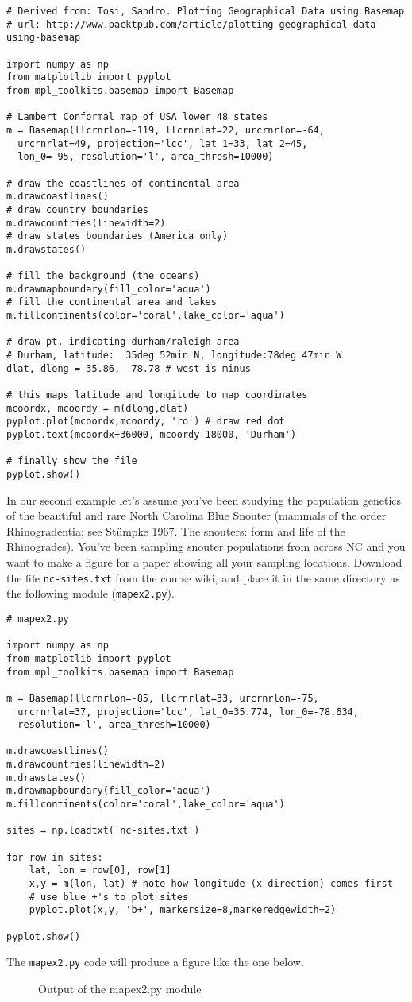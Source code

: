 \begin{lstlisting}
# Derived from: Tosi, Sandro. Plotting Geographical Data using Basemap
# url: http://www.packtpub.com/article/plotting-geographical-data-using-basemap

import numpy as np
from matplotlib import pyplot
from mpl_toolkits.basemap import Basemap

# Lambert Conformal map of USA lower 48 states
m = Basemap(llcrnrlon=-119, llcrnrlat=22, urcrnrlon=-64,
  urcrnrlat=49, projection='lcc', lat_1=33, lat_2=45,
  lon_0=-95, resolution='l', area_thresh=10000)

# draw the coastlines of continental area
m.drawcoastlines()
# draw country boundaries
m.drawcountries(linewidth=2)
# draw states boundaries (America only)
m.drawstates()

# fill the background (the oceans)
m.drawmapboundary(fill_color='aqua')
# fill the continental area and lakes
m.fillcontinents(color='coral',lake_color='aqua')

# draw pt. indicating durham/raleigh area
# Durham, latitude:  35deg 52min N, longitude:78deg 47min W
dlat, dlong = 35.86, -78.78 # west is minus

# this maps latitude and longitude to map coordinates
mcoordx, mcoordy = m(dlong,dlat)
pyplot.plot(mcoordx,mcoordy, 'ro') # draw red dot
pyplot.text(mcoordx+36000, mcoordy-18000, 'Durham')

# finally show the file
pyplot.show()    
\end{lstlisting}
In our second example let's assume you've been studying the population
genetics of the beautiful and rare North Carolina Blue Snouter (mammals
of the order Rhinogradentia; see Stümpke 1967. The snouters: form and
life of the Rhinogrades). You've been sampling snouter populations from
across NC and you want to make a figure for a paper showing all your
sampling locations. Download the file \lstinline!nc-sites.txt! from the
course wiki, and place it in the same directory as the following module
(\lstinline!mapex2.py!).

\begin{lstlisting}
# mapex2.py

import numpy as np
from matplotlib import pyplot
from mpl_toolkits.basemap import Basemap

m = Basemap(llcrnrlon=-85, llcrnrlat=33, urcrnrlon=-75,
  urcrnrlat=37, projection='lcc', lat_0=35.774, lon_0=-78.634,
  resolution='l', area_thresh=10000)

m.drawcoastlines()
m.drawcountries(linewidth=2)
m.drawstates()
m.drawmapboundary(fill_color='aqua')
m.fillcontinents(color='coral',lake_color='aqua')

sites = np.loadtxt('nc-sites.txt')

for row in sites:
    lat, lon = row[0], row[1]
    x,y = m(lon, lat) # note how longitude (x-direction) comes first
    # use blue +'s to plot sites
    pyplot.plot(x,y, 'b+', markersize=8,markeredgewidth=2) 

pyplot.show()    
\end{lstlisting}
The \lstinline!mapex2.py! code will produce a figure like the one below.

\begin{figure}[htbp]
\centering
\caption{Output of the mapex2.py module}
\end{figure}
